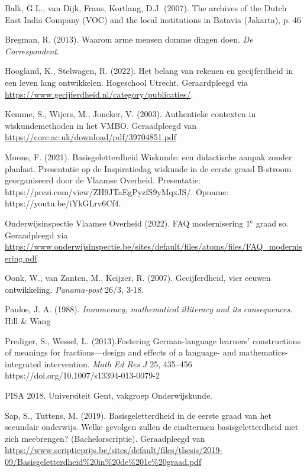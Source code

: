 \begin{bronnen}
\item Balk, G.L., van Dijk, Frans, Kortlang, D.J. (2007). The archives of the Dutch East India Company (VOC) and the local institutions in Batavia (Jakarta), p. 46
\item Bregman, R. (2013). Waarom arme mensen domme dingen doen. \emph{De Correspondent}.
\item Hoogland, K., Stelwagen, R. (2022). Het belang van rekenen en gecijferdheid in een leven lang ontwikkelen. Hogeschool Utrecht. Geraardpleegd via \url{https://www.gecijferdheid.nl/category/publicaties/}.
\item Kemme, S., Wijers, M., Joncker, V. (2003). Authentieke contexten in wiskundemethoden in het VMBO. Geraadpleegd van \url{https://core.ac.uk/download/pdf/39704851.pdf}
\item Moons, F. (2021). Basisgeletterdheid Wiskunde: een didactische aanpak zonder planlast. Presentatie op de Inspiratiedag wiskunde in de eerste graad B-stroom georganiseerd door de Vlaamse Overheid. Presentatie: https://prezi.com/view/ZH9JTaEgPyzfS9yMqxJS/. Opname: https://youtu.be/iYkGLrv6Cf4.
\item Onderwijsinspectie Vlaamse Overheid (2022). FAQ modernisering 1$^\text{e}$ graad so. Geraadpleegd via \url{https://www.onderwijsinspectie.be/sites/default/files/atoms/files/FAQ_modernisering.pdf}.
\item Oonk, W., van Zanten, M., Keijzer, R. (2007). Gecijferdheid, vier eeuwen ontwikkeling. \emph{Panama-post} 26/3, 3-18.
\item Paulos, J. A. (1988). \emph{Innumeracy, mathematical illiteracy and its consequences}. Hill \& Wang
\item Prediger, S., Wessel, L. (2013).Fostering German-language learners’ constructions of meanings for fractions—design and effects of a language- and mathematics-integrated intervention. \emph{Math Ed Res J} 25, 435–456 https://doi.org/10.1007/s13394-013-0079-2
\item PISA 2018. Universiteit Gent, vakgroep Onderwijskunde.
\item Sap, S., Tuttens, M. (2019). Basisgeletterdheid in de eerste graad van het secundair onderwijs. Welke gevolgen zullen de eindtermen basisgeletterdheid met zich meebrengen? (Bachelorscriptie). Geraadpleegd van \url{https://www.scriptieprijs.be/sites/default/files/thesis/2019-09/Basisgeletterdheid%20in%20de%201e%20graad.pdf}

 

\end{bronnen}